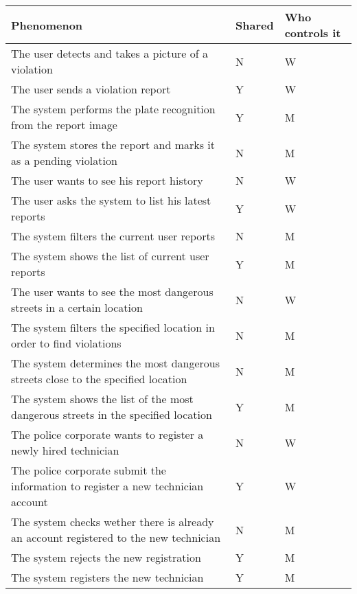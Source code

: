 \begin{longtable}{| p{} | p{} | p{} |} 
      \hline
      Phenomenon & Shared & Who controls it \\
      \hline
      
      The user detects and takes a picture of a violation & N & W\\
      \hline
      The user sends a violation report & Y & W\\
      \hline
      The system performs the plate recognition from the report image & Y & M\\
      \hline
      The system stores the report and marks it as a pending violation& N & M\\
      \hline
      
      The user wants to see his report history & N & W\\
      \hline
      The user asks the system to list his latest reports & Y & W\\
      \hline
      The system filters the current user reports& N & M\\
      \hline
      The system shows the list of current user reports& Y & M\\
      \hline
      
      The user wants to see the most dangerous streets in a certain location& N & W\\
      \hline
      The system filters the specified location in order to find violations& N & M\\
      \hline
      The system determines the most dangerous streets close to the specified location& N & M\\
      \hline
      The system shows the list of the most dangerous streets in the specified location& Y & M\\
      \hline
      
      The police corporate wants to register a newly hired technician& N & W\\
      \hline
      The police corporate submit the information to register a new technician account& Y & W\\
      \hline
      The system checks wether there is already an account registered to the new technician & N & M\\
      \hline
      The system rejects the new registration & Y & M\\
      \hline
      The system registers the new technician & Y & M\\
      \hline


\end{longtable}

